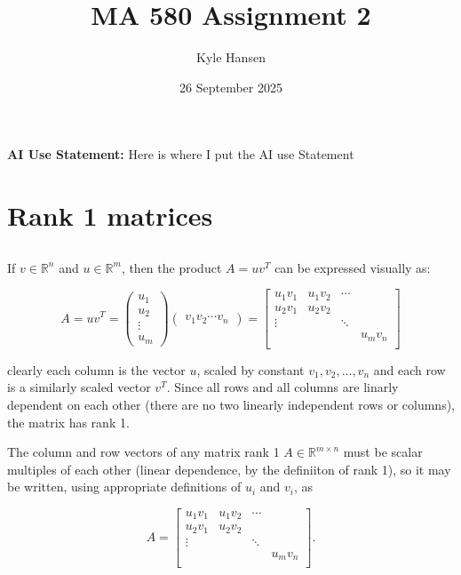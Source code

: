 \documentclass{template}
\title{MA 580 Assignment 2}
\author{Kyle Hansen}
\date{26 September 2025}
\begin{document}
\maketitle

\textbf{AI Use Statement: }Here is where I put the AI use Statement


\section{Rank 1 matrices}

\subsection{}

If $v \in \mathbb{R}^n$ and $u \in \mathbb{R}^m$, then the product $A = uv^T$ can be expressed visually as:

\begin{equation}\label{eq:first-statement}
  A = uv^T = \begin{pmatrix}
            u_1\\
            u_2\\
            \vdots \\
            u_m\end{pmatrix} \begin{pmatrix}
              v_1 v_2 \cdots v_n
  \end{pmatrix} = 
  \begin{bmatrix}
    u_1v_1 & u_1v_2 & \cdots &   \\
    u_2v_1 & u_2v_2 &  &  \\
    \vdots  &  &  \ddots  &  \\
      &  & &  u_mv_n  \\
  \end{bmatrix}
\end{equation}

clearly each column is the vector $u$, scaled by constant $v_1, v_2, \dots, v_n$ and each row is a similarly scaled vector $v^T$. Since all rows and all columns are linarly dependent on each other (there are no two linearly independent rows or columns), the matrix has rank 1.

The column and row vectors of any matrix rank 1 $A \in \mathbb{R}^{m\times n}$ must be scalar multiples of each other (linear dependence, by the definiiton of rank 1), so it may be written, using appropriate definitions of $u_i$ and $v_i$, as

\begin{equation}
  A = \begin{bmatrix}
    u_1v_1 & u_1v_2 & \cdots &   \\
    u_2v_1 & u_2v_2 &  &  \\
    \vdots  &  &  \ddots  &  \\
      &  & &  u_mv_n  \\
  \end{bmatrix}.
\end{equation}
\end{document}
